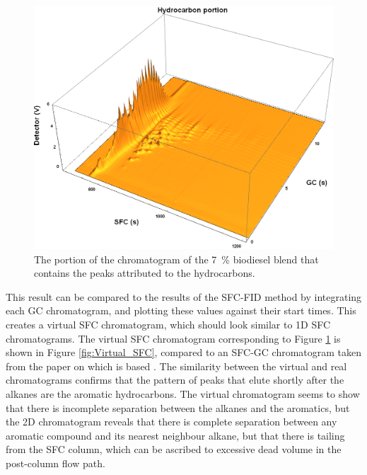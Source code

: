 \begin{figure}
	\centering
	\includegraphics[width=\textwidth]{Figures/Hydrocarbons_Portion.png}
	\decoRule	
	
\caption[Hydrocarbons in RME/diesel blend.]{The portion of the chromatogram of the
\SI{7}{\percent} biodiesel blend that contains the peaks attributed to the hydrocarbons.}
	
	\label{fig:Hydrocarbons_Portion} 
\end{figure}

This result can be compared to the results of the SFC-FID method by integrating
each \twoD GC chromatogram, and plotting these values against their start times.
This creates a virtual SFC chromatogram, which should look similar to 1D SFC
chromatograms. The virtual SFC chromatogram corresponding to Figure
\ref{fig:Hydrocarbons_Portion} is shown in Figure \ref{fig:Virtual_SFC},
compared to an SFC-GC chromatogram taken from the paper on which 
is based \autocite{DiSanzo1991}. The similarity between the virtual and real
chromatograms confirms that the pattern of peaks that elute shortly after the
alkanes are the aromatic hydrocarbons. The virtual chromatogram seems to show
that there is incomplete separation between the alkanes and the aromatics, but
the 2D chromatogram reveals that there is complete separation between any aromatic
compound and its nearest neighbour alkane, but that there is tailing from the
SFC column, which can be ascribed to excessive dead volume in the post-column
flow path.

